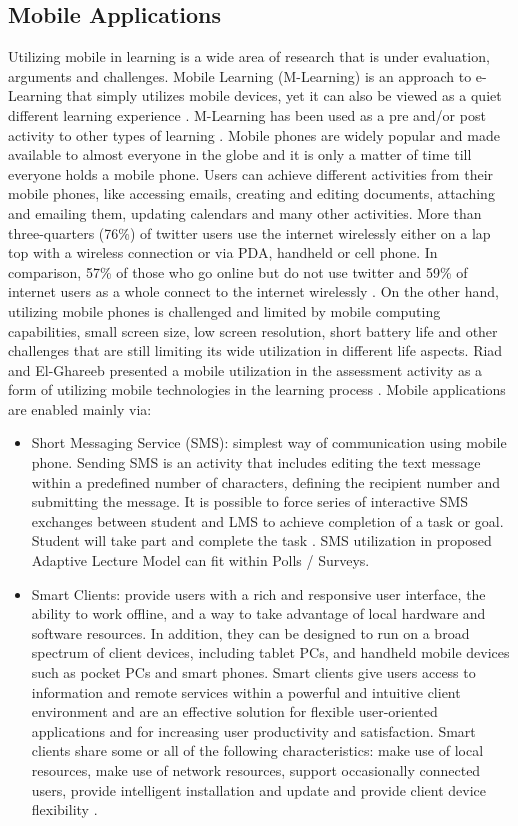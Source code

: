 \documentclass[12pt,a4paper,final,twoside,onecolumn,titlepage]{book}
\begin{document}
\subsection{Mobile Applications}
Utilizing mobile in learning is a wide area of research that is under evaluation, arguments and challenges. Mobile Learning (M-Learning) is an approach to e-Learning that simply utilizes mobile devices, yet it can also be viewed as a quiet different learning experience \cite{W17}. M-Learning has been used as a pre and/or post activity to other types of learning \cite{W18}. Mobile phones are widely popular and made available to almost everyone in the globe and it is only a matter of time till everyone holds a mobile phone. Users can achieve different activities from their mobile phones, like accessing emails, creating and editing documents, attaching and emailing them, updating calendars and many other activities. More than three-quarters (76\%) of twitter users use the internet wirelessly either on a lap top with a wireless connection or via PDA, handheld or cell phone. In comparison, 57\% of those who go online but do not use twitter and 59\% of internet users as a whole connect to the internet wirelessly \cite{W04}. On the other hand, utilizing mobile phones is challenged and limited by mobile computing capabilities, small screen size, low screen resolution, short battery life and other challenges that are still limiting its wide utilization in different life aspects. Riad and El-Ghareeb presented a mobile utilization in the assessment activity as a form of utilizing mobile technologies in the learning process \cite{EV10}. Mobile applications are enabled mainly via:
\begin{itemize}
\item Short Messaging Service (SMS): simplest way of communication using mobile phone. Sending SMS is an activity that includes editing the text message within a predefined number of characters, defining the recipient number and submitting the message. It is possible to force series of interactive SMS exchanges between student and \gls{LMS} to achieve completion of a task or goal. Student will take part and complete the task \cite{W20}. SMS utilization in proposed Adaptive Lecture Model can fit within Polls / Surveys.
\item Smart Clients: provide users with a rich and responsive user interface, the ability to work offline, and a way to take advantage of local hardware and software resources. In addition, they can be designed to run on a broad spectrum of client devices, including tablet PCs, and handheld mobile devices such as pocket PCs and smart phones. Smart clients give users access to information and remote services within a powerful and intuitive client environment and are an effective solution for flexible user-oriented applications and for increasing user productivity and satisfaction. Smart clients share some or all of the following characteristics: make use of local resources, make use of network resources, support occasionally connected users, provide intelligent installation and update and provide client device flexibility \cite{W21}.
\end{itemize}
\end{document}
